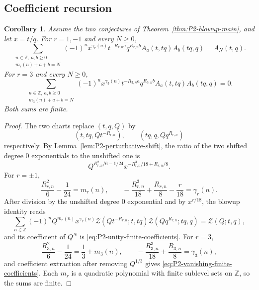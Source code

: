 \documentclass{amsart}
\newtheorem{corollary}{Corollary}
\theoremstyle{definition}
\numberwithin{equation}{section}
\newcommand{\Z}{\mathbb Z}
\begin{document}
\subsection{Coefficient recursion}
\begin{corollary}
\label{cor:P2-finite-coefficients}
Assume the two conjectures of Theorem~\ref{thm:P2-blowup-main}, and let \(x=t/q\).  For \(r=1,-1\) and every \(N\geq0\),
\begin{equation}
 \sum_{\substack{n\in\Z,\ a,b\geq0\\m_r(n)+a+b=N}}
 (-1)^n x^{\gamma_r(n)}
 t^{-R_{r,n}a}q^{R_{r,n}b}
 A_a(t,tq)A_b(tq,q)=A_N(t,q).
\label{eq:P2-unity-finite-coefficients}
\end{equation}
For \(r=3\) and every \(N\geq0\),
\begin{equation}
 \sum_{\substack{n\in\Z,\ a,b\geq0\\m_3(n)+a+b=N}}
 (-1)^n x^{\gamma_3(n)}
 t^{-R_{3,n}a}q^{R_{3,n}b}
 A_a(t,tq)A_b(tq,q)=0.
\label{eq:P2-vanishing-finite-coefficients}
\end{equation}
Both sums are finite.
\end{corollary}

\begin{proof}
The two charts replace \((t,q,Q)\) by
\[
 (t,tq,Qt^{-R_{r,n}}),\qquad
 (tq,q,Qq^{R_{r,n}})
\]
respectively.  By Lemma~\ref{lem:P2-perturbative-shift}, the ratio of the two shifted degree \(0\) exponentials to the unshifted one is
\begin{equation}
 Q^{R_{r,n}^2/6-1/24}
 x^{-R_{r,n}^3/18+R_{r,n}/8}.
\label{eq:P2-perturbative-ratio}
\end{equation}
For \(r=\pm1\),
\[
 \frac{R_{r,n}^2}{6}-\frac1{24}=m_r(n),\qquad
 -\frac{R_{r,n}^3}{18}+\frac{R_{r,n}}8-\frac r{18}
 =\gamma_r(n).
\]
After division by the unshifted degree \(0\) exponential and by \(x^{r/18}\), the blowup identity reads
\[
 \sum_{n\in\Z}(-1)^nQ^{m_r(n)}x^{\gamma_r(n)}
 \mathcal Z(Qt^{-R_{r,n}};t,tq)
 \mathcal Z(Qq^{R_{r,n}};tq,q)
 =\mathcal Z(Q;t,q),
\]
and its coefficient of \(Q^N\) is \eqref{eq:P2-unity-finite-coefficients}.  For \(r=3\),
\[
 \frac{R_{3,n}^2}{6}-\frac1{24}=\frac13+m_3(n),\qquad
 -\frac{R_{3,n}^3}{18}+\frac{R_{3,n}}8=\gamma_3(n),
\]
and coefficient extraction after removing \(Q^{1/3}\) gives \eqref{eq:P2-vanishing-finite-coefficients}.  Each \(m_r\) is a quadratic polynomial with finite sublevel sets on \(\Z\), so the sums are finite.
\end{proof}
\end{document}
